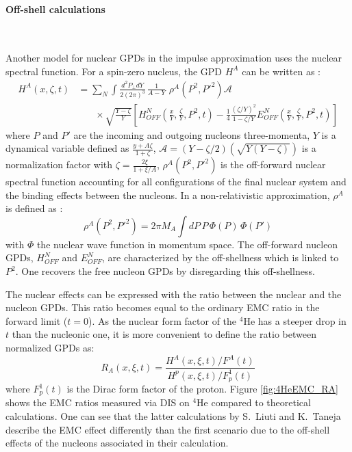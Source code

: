 \paragraph{Off-shell calculations} ~

Another model for nuclear GPDs in the impulse approximation uses the nuclear spectral function. For a spin-zero nucleus, the GPD $H^{A}$ can be written as \cite{EMC_simonetta}:
\begin{align}
H^{A}(x, \zeta, t) &= \sum_{N} \int \frac{d^{2}P_{\perp} dY}{2(2\pi)^3} \, 
   \frac{1}{A-Y}\,  \, \rho^{A}(P^2, P'^2) \mathcal{A}\\ \nonumber
& ~~~~~~~~ \times \sqrt{\frac{Y-\zeta}{Y}} \left[H^{N}_{OFF}(\frac{x}{Y}, 
\frac{\zeta}{Y},P^2, t) - \frac{1}{4} \frac{(\zeta/Y)^2}{1-\zeta/Y } 
E^{N}_{OFF}(\frac{x}{Y}, \frac{\zeta}{Y},P^2, t) \right]
\label{eq:simonetta}
\end{align}
where $P$ and $P'$ are the incoming and outgoing nucleons three-momenta, $Y$ is 
a dynamical variable defined as $\frac{y+A\zeta}{1+\zeta}$, $\mathcal{A} = 
(Y-\zeta/2)(\sqrt{Y(Y-\zeta)})$ is a normalization factor with $\zeta = 
\frac{2\xi}{1+\xi/A}$, $\rho^{A}(P^2, P'^2)$ is the off-forward nuclear 
spectral function accounting for all configurations of the final nuclear system 
and the binding effects between the nucleons. In a non-relativistic 
approximation, $\rho^{A}$ is defined as \cite{simonetta_2}:
\begin{equation}
\rho^{A}(P^2, P'^2) = 2\pi M_A \int dP\,P\,\Phi(P)\,\Phi(P') 
\end{equation}
with $\Phi$ the nuclear wave function in momentum space. The off-forward nucleon GPDs, $H^{N}_{OFF}$ and $E^{N}_{OFF}$, are characterized by the off-shellness which is linked to $P^2$. One recovers the free nucleon GPDs by disregarding this off-shellness.  

The nuclear effects can be expressed with the ratio between the nuclear and the nucleon GPDs. This ratio becomes equal to the ordinary EMC ratio in the forward limit ($t = 0$). As the nuclear form factor of the $^4$He has a steeper drop in $t$ than the nucleonic one, it is more convenient to define the ratio between normalized GPDs as:
\begin{equation}
R_{A}(x, \xi,t) = \frac{H^{A}(x, \xi, t)/F^{A}(t)}{H^{p}(x, \xi, t)/F^{1}_{p}(t)}
\end{equation}
where $F^{1}_{p}(t)$ is the Dirac form factor of the proton. Figure \ref{fig:4HeEMC_RA} shows the EMC ratios measured via DIS on $^4$He compared to theoretical calculations. One can see that the latter calculations by S.~Liuti and K.~Taneja describe the EMC effect differently than the first scenario due to the off-shell effects of the nucleons associated in their calculation. 

